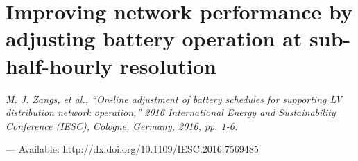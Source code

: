 \chapter{Improving network performance by adjusting battery operation at sub-half-hourly resolution}
\label{ch1}

\singlespacing
\epigraph{\textit{M. J. Zangs, et al., ``On-line adjustment of battery schedules for supporting LV distribution network operation,'' 2016 International Energy and Sustainability Conference (IESC), Cologne, Germany, 2016, pp. 1-6.}}{--- Available: http://dx.doi.org/10.1109/IESC.2016.7569485}
\doublespacing












